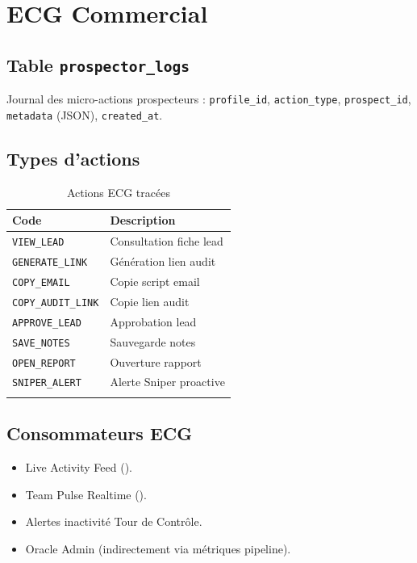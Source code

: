 \documentclass[11pt,a4paper]{report}
\begin{document}
\chapter{ECG Commercial}
\label{ch:ecg}

\section{Table \texttt{prospector\_logs}}

Journal des micro-actions prospecteurs : \texttt{profile\_id}, \texttt{action\_type}, \texttt{prospect\_id}, \texttt{metadata} (JSON), \texttt{created\_at}.

\section{Types d'actions}

\begin{longtable}{@{}ll@{}}
\toprule
\textbf{Code} & \textbf{Description} \\
\midrule
\endhead
\texttt{VIEW\_LEAD} & Consultation fiche lead \\
\texttt{GENERATE\_LINK} & Génération lien audit \\
\texttt{COPY\_EMAIL} & Copie script email \\
\texttt{COPY\_AUDIT\_LINK} & Copie lien audit \\
\texttt{APPROVE\_LEAD} & Approbation lead \\
\texttt{SAVE\_NOTES} & Sauvegarde notes \\
\texttt{OPEN\_REPORT} & Ouverture rapport \\
\texttt{SNIPER\_ALERT} & Alerte Sniper proactive \\
\bottomrule
\caption{Actions ECG tracées}
\end{longtable}

\section{Consommateurs ECG}

\begin{itemize}[noitemsep]
  \item Live Activity Feed ().
  \item Team Pulse Realtime ().
  \item Alertes inactivité Tour de Contrôle.
  \item Oracle Admin (indirectement via métriques pipeline).
\end{itemize}
\end{document}
